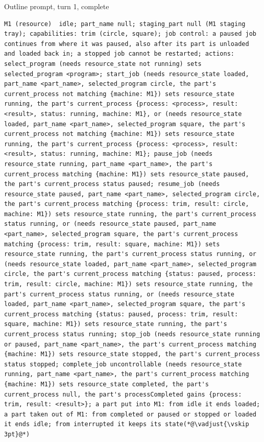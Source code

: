 \documentclass[preprint,12pt,authoryear]{elsarticle}
\begin{document}
\begin{fullbox}{Outline prompt, turn 1, complete}
\begin{lstlisting}[showlines=true]
M1 (resource)  idle; part_name null; staging_part null (M1 staging tray); capabilities: trim (circle, square); job control: a paused job continues from where it was paused, also after its part is unloaded and loaded back in; a stopped job cannot be restarted; actions: select_program (needs resource_state not running) sets selected_program <program>; start_job (needs resource_state loaded, part_name <part_name>, selected_program circle, the part's current_process not matching {machine: M1}) sets resource_state running, the part's current_process {process: <process>, result: <result>, status: running, machine: M1}, or (needs resource_state loaded, part_name <part_name>, selected_program square, the part's current_process not matching {machine: M1}) sets resource_state running, the part's current_process {process: <process>, result: <result>, status: running, machine: M1}; pause_job (needs resource_state running, part_name <part_name>, the part's current_process matching {machine: M1}) sets resource_state paused, the part's current_process status paused; resume_job (needs resource_state paused, part_name <part_name>, selected_program circle, the part's current_process matching {process: trim, result: circle, machine: M1}) sets resource_state running, the part's current_process status running, or (needs resource_state paused, part_name <part_name>, selected_program square, the part's current_process matching {process: trim, result: square, machine: M1}) sets resource_state running, the part's current_process status running, or (needs resource_state loaded, part_name <part_name>, selected_program circle, the part's current_process matching {status: paused, process: trim, result: circle, machine: M1}) sets resource_state running, the part's current_process status running, or (needs resource_state loaded, part_name <part_name>, selected_program square, the part's current_process matching {status: paused, process: trim, result: square, machine: M1}) sets resource_state running, the part's current_process status running; stop_job (needs resource_state running or paused, part_name <part_name>, the part's current_process matching {machine: M1}) sets resource_state stopped, the part's current_process status stopped; complete_job uncontrollable (needs resource_state running, part_name <part_name>, the part's current_process matching {machine: M1}) sets resource_state completed, the part's current_process null, the part's processCompleted gains {process: trim, result: <result>}; a part put into M1: from idle it ends loaded; a part taken out of M1: from completed or paused or stopped or loaded it ends idle; from interrupted it keeps its state(*@\vadjust{\vskip 3pt}@*)

\end{lstlisting}
\end{fullbox}
\end{document}
